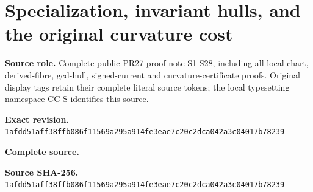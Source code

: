 \begingroup
\sloppy
\small
\makeatletter
\let\EndpointOriginalTagForm\tagform@
\def\tagform@#1{\EndpointOriginalTagForm{CC-S\, #1}}
\makeatother
\clearpage
\section{Specialization, invariant hulls, and the original curvature cost}
\noindent\textbf{Source role.} Complete public PR27 proof note S1-S28, including all local chart, derived-fibre, gcd-hull, signed-current and curvature-certificate proofs. Original display tags retain their complete literal source tokens; the local typesetting namespace CC-S identifies this source.\par
\noindent\textbf{Exact revision.} \nolinkurl{1afdd51aff38ffb086f11569a295a914fe3eae7c20c2dca042a3c04017b78239}\par
\noindent\textbf{Complete source.} \par
\noindent\textbf{Source SHA-256.} \nolinkurl{1afdd51aff38ffb086f11569a295a914fe3eae7c20c2dca042a3c04017b78239}\par\medskip

\endgroup
